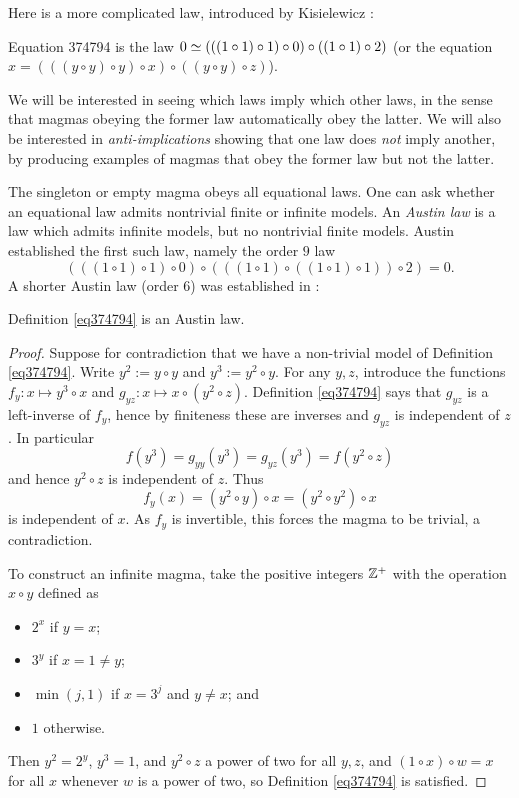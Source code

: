 Here is a more complicated law, introduced by Kisielewicz \cite{Kisielewicz}:

\begin{definition}[Equation 374794]
  \leanok
  \label{eq374794}
  Equation 374794 is the law $0  \simeq  (((1 \circ 1) \circ 1) \circ 0) \circ ((1 \circ 1) \circ 2)$ (or the equation $x = (((y \circ y) \circ y) \circ x) \circ ((y \circ y) \circ z)$).
\end{definition}

We will be interested in seeing which laws imply which other laws, in the sense that magmas obeying the former law automatically obey the latter.  We will also be interested in \emph{anti-implications} showing that one law does \emph{not} imply another, by producing examples of magmas that obey the former law but not the latter.

The singleton or empty magma obeys all equational laws.  One can ask whether an equational law admits nontrivial finite or infinite models.  An \emph{Austin law} is a law which admits infinite models, but no nontrivial finite models.  Austin \cite{austin} established the first such law, namely the order $9$ law
$$ (((1 \circ 1) \circ 1) \circ 0) \circ (((1 \circ 1) \circ ((1 \circ 1) \circ 1)) \circ 2) = 0.$$
A shorter Austin law (order $6$) was established in \cite{Kisielewicz}:

\begin{theorem}
  \leanok
  \label{kis-thm}
  Definition \ref{eq374794} is an Austin law.
\end{theorem}

\begin{proof} \leanok Suppose for contradiction that we have a non-trivial model of Definition \ref{eq374794}. Write $y^2 := y \circ y$ and $y^3 := y^2 \circ y$. For any $y,z$, introduce the functions $f_y: x \mapsto y^3 \circ x$ and $g_{yz}: x \mapsto x \circ (y^2 \circ z)$.  Definition \ref{eq374794} says that $g_{yz}$ is a left-inverse of $f_y$, hence by finiteness these are inverses and $g_{yz}$ is independent of $z$. In particular
$$ f(y^3) = g_{yy}(y^3) = g_{yz}(y^3) = f(y^2 \circ z)$$
and hence $y^2 \circ z$ is independent of $z$.  Thus
$$ f_y(x) = (y^2 \circ y) \circ x = (y^2 \circ y^2) \circ x$$
is independent of $x$.  As $f_y$ is invertible, this forces the magma to be trivial, a contradiction.

To construct an infinite magma, take the positive integers $\mathbb{Z}^+$ with the operation $x \circ y$ defined as
\begin{itemize}
  \item $2^x$ if $y=x$;
  \item $3^y$ if $x = 1 \neq y$;
  \item $\min(j,1)$ if $x=3^j$ and $y \neq x$; and
  \item $1$ otherwise.
\end{itemize}
Then $y^2 = 2^y$, $y^3 = 1$, and $y^2 \circ z$ a power of two for all $y, z$, and $(1 \circ x) \circ w = x$ for all $x$ whenever $w$ is a power of two, so Definition \ref{eq374794} is satisfied.
\end{proof}

